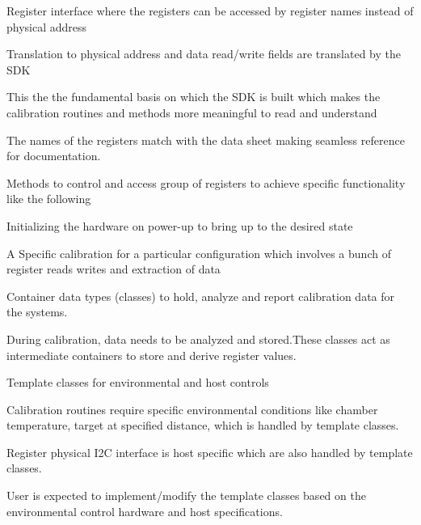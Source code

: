 \begin{DoxyItemize}
\item Register interface where the registers can be accessed by register names instead of physical address
\begin{DoxyItemize}
\item Translation to physical address and data read/write fields are translated by the S\+DK
\item This the the fundamental basis on which the S\+DK is built which makes the calibration routines and methods more meaningful to read and understand
\item The names of the registers match with the data sheet making seamless reference for documentation.
\end{DoxyItemize}
\item Methods to control and access group of registers to achieve specific functionality like the following
\begin{DoxyItemize}
\item Initializing the hardware on power-\/up to bring up to the desired state
\item A Specific calibration for a particular configuration which involves a bunch of register reads writes and extraction of data
\end{DoxyItemize}
\item Container data types (classes) to hold, analyze and report calibration data for the systems.
\begin{DoxyItemize}
\item During calibration, data needs to be analyzed and stored.\+These classes act as intermediate containers to store and derive register values.
\end{DoxyItemize}
\item Template classes for environmental and host controls
\begin{DoxyItemize}
\item Calibration routines require specific environmental conditions like chamber temperature, target at specified distance, which is handled by template classes.
\item Register physical I2C interface is host specific which are also handled by template classes.
\item User is expected to implement/modify the template classes based on the environmental control hardware and host specifications.
\end{DoxyItemize}
\end{DoxyItemize}





